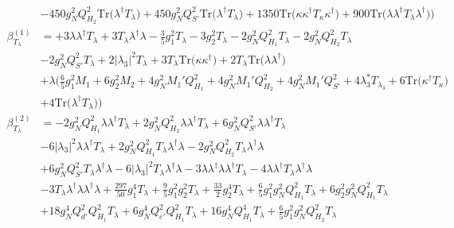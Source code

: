 {\begin{align}
 &-450 g_{N}^{2} Q_{H_2}^{2} \mbox{Tr}\Big({\lambda^{\dagger}  T_{\lambda}}\Big) +450 g_{N}^{2} Q_{S'}^{2} \mbox{Tr}\Big({\lambda^{\dagger}  T_{\lambda}}\Big) +1350 \mbox{Tr}\Big({\kappa  \kappa^{\dagger}  T_{\kappa}  \kappa^{\dagger}}\Big) +900 \mbox{Tr}\Big({\lambda  \lambda^{\dagger}  T_{\lambda}  \lambda^{\dagger}}\Big) \Big)\\ 
\beta_{T_{\lambda}}^{(1)} & =  
+3 {\lambda  \lambda^{\dagger}  T_{\lambda}} +3 {T_{\lambda}  \lambda^{\dagger}  \lambda} -\frac{3}{5} g_{1}^{2} T_{\lambda} -3 g_{2}^{2} T_{\lambda} -2 g_{N}^{2} Q_{H_1}^{2} T_{\lambda} -2 g_{N}^{2} Q_{H_2}^{2} T_{\lambda} \nonumber \\ 
 &-2 g_{N}^{2} Q_{S'}^{2} T_{\lambda} +2 |\lambda_3|^2 T_{\lambda} +3 T_{\lambda} \mbox{Tr}\Big({\kappa  \kappa^{\dagger}}\Big) +2 T_{\lambda} \mbox{Tr}\Big({\lambda  \lambda^{\dagger}}\Big) \nonumber \\ 
 &+\lambda \Big(\frac{6}{5} g_{1}^{2} M_1 +6 g_{2}^{2} M_2 +4 g_{N}^{2} M_1' Q_{H_1}^{2} +4 g_{N}^{2} M_1' Q_{H_2}^{2} +4 g_{N}^{2} M_1' Q_{S'}^{2} +4 \lambda_3^* T_{\lambda_3} +6 \mbox{Tr}\Big({\kappa^{\dagger}  T_{\kappa}}\Big) \nonumber \\ 
 &+4 \mbox{Tr}\Big({\lambda^{\dagger}  T_{\lambda}}\Big) \Big)\\ 
\beta_{T_{\lambda}}^{(2)} & =  
-2 g_{N}^{2} Q_{H_1}^{2} {\lambda  \lambda^{\dagger}  T_{\lambda}} +2 g_{N}^{2} Q_{H_2}^{2} {\lambda  \lambda^{\dagger}  T_{\lambda}} +6 g_{N}^{2} Q_{S'}^{2} {\lambda  \lambda^{\dagger}  T_{\lambda}} \nonumber \\ 
 &-6 |\lambda_3|^2 {\lambda  \lambda^{\dagger}  T_{\lambda}} +2 g_{N}^{2} Q_{H_1}^{2} {T_{\lambda}  \lambda^{\dagger}  \lambda} -2 g_{N}^{2} Q_{H_2}^{2} {T_{\lambda}  \lambda^{\dagger}  \lambda} \nonumber \\ 
 &+6 g_{N}^{2} Q_{S'}^{2} {T_{\lambda}  \lambda^{\dagger}  \lambda} -6 |\lambda_3|^2 {T_{\lambda}  \lambda^{\dagger}  \lambda} -3 {\lambda  \lambda^{\dagger}  \lambda  \lambda^{\dagger}  T_{\lambda}} -4 {\lambda  \lambda^{\dagger}  T_{\lambda}  \lambda^{\dagger}  \lambda} \nonumber \\ 
 &-3 {T_{\lambda}  \lambda^{\dagger}  \lambda  \lambda^{\dagger}  \lambda} +\frac{297}{50} g_{1}^{4} T_{\lambda} +\frac{9}{5} g_{1}^{2} g_{2}^{2} T_{\lambda} +\frac{33}{2} g_{2}^{4} T_{\lambda} +\frac{6}{5} g_{1}^{2} g_{N}^{2} Q_{H_1}^{2} T_{\lambda} +6 g_{2}^{2} g_{N}^{2} Q_{H_1}^{2} T_{\lambda} \nonumber \\ 
 &+18 g_{N}^{4} Q_{d'}^{2} Q_{H_1}^{2} T_{\lambda} +6 g_{N}^{4} Q_{e'}^{2} Q_{H_1}^{2} T_{\lambda} +16 g_{N}^{4} Q_{H_1}^{4} T_{\lambda} +\frac{6}{5} g_{1}^{2} g_{N}^{2} Q_{H_2}^{2} T_{\lambda} \nonumber \\ 

\end{align}}
